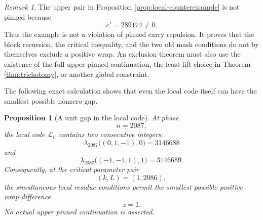 \documentclass[11pt]{article}
\newtheorem{proposition}[theorem]{Proposition}
\theoremstyle{remark}
\newtheorem{remark}[theorem]{Remark}
\newcommand{\Lset}{\mathcal{L}}
\begin{document}
\begin{remark}
The upper pair in Proposition \ref{prop:local-counterexample} is not pinned because
\[
c'=289174\ne0.
\]
Thus the example is not a violation of pinned carry repulsion.  It proves that the block recursion, the critical inequality, and the two old mask conditions do not by themselves exclude a positive wrap.  An exclusion theorem must also use the existence of the full upper pinned continuation, the least-lift choice in Theorem \ref{thm:trichotomy}, or another global constraint.
\end{remark}

The following exact calculation shows that even the local code itself can have the smallest possible nonzero gap.

\begin{proposition}[A unit gap in the local code]
\label{prop:unit-gap}
At phase
\[
n=2087,
\]
the local code \(\Lset_n\) contains two consecutive integers:
\[
\lambda_{2087}\bigl((0,1,-1),0\bigr)=3146688
\]
and
\[
\lambda_{2087}\bigl((-1,-1,1),1\bigr)=3146689.
\]
Consequently, at the critical parameter pair
\[
(k,L)=(1,2086),
\]
the simultaneous local residue conditions permit the smallest possible positive wrap difference
\[
z=1.
\]
No actual upper pinned continuation is asserted.
\end{proposition}
\end{document}
